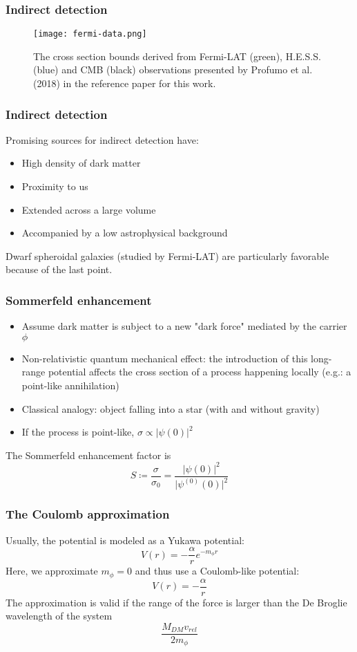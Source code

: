 \documentclass{beamer}
\begin{document}
\begin{frame}
\frametitle{Indirect detection}
\begin{figure}[htbp]
	\centering
	\texttt{[image: fermi-data.png]}
	\caption{The cross section bounds derived from Fermi-LAT (green), H.E.S.S. (blue) and CMB (black) observations presented by Profumo et al. (2018) in the reference paper for this work.}
	\label{fig:fermi}
\end{figure}
\end{frame}

\begin{frame}
\frametitle{Indirect detection}
Promising sources for indirect detection have:
\begin{itemize}
	\item High density of dark matter
	\item Proximity to us
	\item Extended across a large volume
	\item Accompanied by a low astrophysical background
\end{itemize}
\pause
Dwarf spheroidal galaxies (studied by Fermi-LAT) are particularly favorable because of the last point.
\end{frame}

\begin{frame}
\frametitle{Sommerfeld enhancement}
\begin{itemize}
	\item Assume dark matter is subject to a new "dark force" mediated by the carrier \(\phi\)
	\item Non-relativistic quantum mechanical effect: the introduction of this long-range potential affects the cross section of a process happening locally (e.g.: a point-like annihilation)
	\item Classical analogy: object falling into a star (with and without gravity)
	\item If the process is point-like, \(\sigma \propto \vert \psi(0) \vert ^2\)
\end{itemize}
\pause
The Sommerfeld enhancement factor is
\[
	S \coloneqq \frac{\sigma }{\sigma _0} = \frac{\vert \psi (0) \vert ^2 }{\vert \psi^{(0)}(0) \vert ^2 }
\]
\end{frame}

\begin{frame}
\frametitle{The Coulomb approximation}
Usually, the potential is modeled as a Yukawa potential:
\[
	V(r) = -\frac{\alpha }{r} e^{- m_{\phi } r }
\]
\pause
Here, we approximate \(m_\phi = 0\) and thus use a Coulomb-like potential:
\[
	V(r) = - \frac{\alpha }{r}
\]
\pause
The approximation is valid if the range of the force is larger than the De Broglie wavelength of the system
\[
	\frac{M_{DM} v_{rel} }{2 m_{\phi } }
\]
\end{frame}
\end{document}
